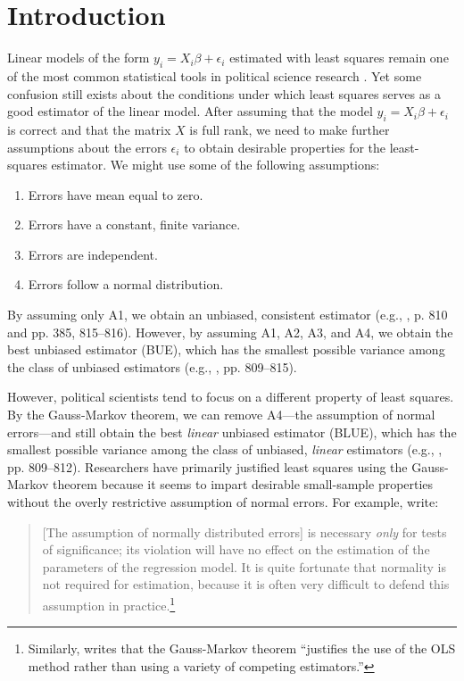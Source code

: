 \documentclass[12pt]{article}
\begin{document}
\thispagestyle{empty}

\newpage
\doublespace

\section*{Introduction}

Linear models of the form $y_i = X_i\beta + \epsilon_i$ estimated with least squares remain one of the most common statistical tools in political science research \citep{KruegerLewisBeck2008}. 
Yet some confusion still exists about the conditions under which least squares serves as a good estimator of the linear model. 
After assuming that the model $y_i = X_i\beta + \epsilon_i$ is correct and that the matrix $X$ is full rank, we need to make further assumptions about the errors $\epsilon_i$ to obtain desirable properties for the least-squares estimator. We might use some of the following assumptions:
\begin{enumerate}[label= A\arabic*:]
  \item Errors have mean equal to zero.
  \item Errors have a constant, finite variance.
  \item Errors are independent.
  \item Errors follow a normal distribution.
\end{enumerate}
By assuming only A1, we obtain an unbiased, consistent estimator (e.g., \citealt{Wooldridge2013}, p. 810 and pp. 385, 815--816). 
However, by assuming A1, A2, A3, and A4, we obtain the best unbiased estimator (BUE), which has the smallest possible variance among the class of unbiased estimators (e.g., \citealt{Wooldridge2013}, pp. 809--815).

However, political scientists tend to focus on a different property of least squares. By the Gauss-Markov theorem, we can remove A4---the assumption of normal errors---and still obtain the best \textit{linear} unbiased estimator (BLUE), which has the smallest possible variance among the class of unbiased, \textit{linear} estimators (e.g., \citealt{Wooldridge2013}, pp. 809--812). 
Researchers have primarily justified least squares using the Gauss-Markov theorem because it seems to impart desirable small-sample properties without the overly restrictive assumption of normal errors.
For example, \cite{BerryFeldman1985} write: 
\begin{quote}
[The assumption of normally distributed errors] is necessary \textit{only} for tests of significance; its violation will have no effect on the estimation of the parameters of the regression model. It is quite fortunate that normality is not required for estimation, because it is often very difficult to defend this assumption in practice.\footnote{Similarly, \citet[p. 101]{Wooldridge2013} writes that the Gauss-Markov theorem ``justifies the use of the OLS method rather than using a variety of competing estimators.''}
\end{quote}
\end{document}
